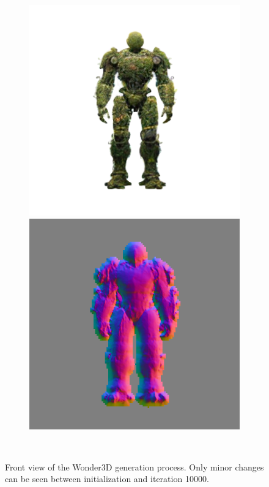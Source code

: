 \begin{figure}[H]
\begin{subfigure}[b]{0.18\textwidth}
        \caption{}
    \end{subfigure}
    \begin{subfigure}[b]{0.18\textwidth}
        \centering
        \fontsize{9pt}{7pt}\selectfont{}
        \includegraphics[width=\textwidth]{etc/a robot made out of plants/wonder3d/test/wonder3D_10000_front_part1}
        \includegraphics[width=\textwidth]{etc/a robot made out of plants/wonder3d/test/wonder3D_10000_front_part4}
        \caption{}
    \end{subfigure}
    \caption{Front view of the Wonder3D generation process. Only minor changes can be seen between initialization and iteration 10000.}~\label{fig:generationWonder3D}
  \end{figure}